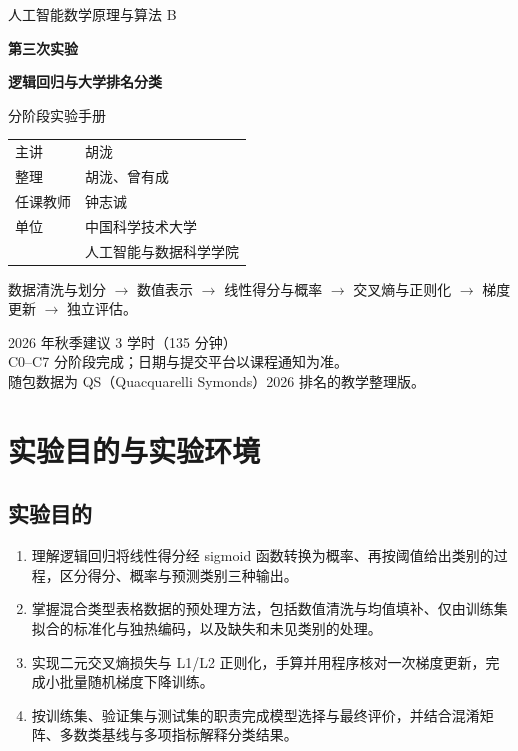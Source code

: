 \documentclass[UTF8,a4paper,11pt,fontset=fandol]{ctexart}
\begin{document}
\hypersetup{pageanchor=false}
\begin{titlepage}
\thispagestyle{empty}
\vspace*{1.4cm}
{\Large\color{Navy}人工智能数学原理与算法 B\par}
\vspace{1.0cm}
{\huge\bfseries\color{Ink}第三次实验\par}
\vspace{.4cm}
{\LARGE\bfseries\color{Navy}逻辑回归与大学排名分类\par}
\vspace{.8cm}
{\Large 分阶段实验手册\par}
\vspace{1.1cm}
\begin{tabular}{@{}ll}
主讲 & 胡泷\\[.5em]
整理 & 胡泷、曾有成\\[.5em]
任课教师 & 钟志诚\\[.5em]
单位 & 中国科学技术大学\\
 & 人工智能与数据科学学院
\end{tabular}
\vspace{1cm}
\begin{keybox}[从数据到可解释的分类流程]
数据清洗与划分 $\rightarrow$ 数值表示 $\rightarrow$ 线性得分与概率
$\rightarrow$ 交叉熵与正则化 $\rightarrow$ 梯度更新 $\rightarrow$ 独立评估。
\end{keybox}
\vfill
2026 年秋季\quad 建议 3 学时（135 分钟）\\
C0--C7 分阶段完成；日期与提交平台以课程通知为准。\\
随包数据为 QS（Quacquarelli Symonds）2026 排名的教学整理版。
\end{titlepage}
\hypersetup{pageanchor=true}
\tableofcontents\clearpage{}
\section{实验目的与实验环境}
\subsection{实验目的}
\begin{enumerate}
\item 理解逻辑回归将线性得分经 sigmoid 函数转换为概率、再按阈值给出类别的过程，区分得分、概率与预测类别三种输出。
\item 掌握混合类型表格数据的预处理方法，包括数值清洗与均值填补、仅由训练集拟合的标准化与独热编码，以及缺失和未见类别的处理。
\item 实现二元交叉熵损失与 L1/L2 正则化，手算并用程序核对一次梯度更新，完成小批量随机梯度下降训练。
\item 按训练集、验证集与测试集的职责完成模型选择与最终评价，并结合混淆矩阵、多数类基线与多项指标解释分类结果。
\end{enumerate}
\end{document}

